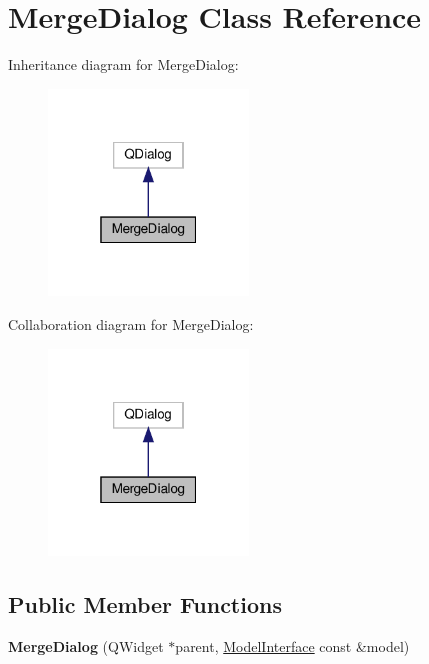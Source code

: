 \hypertarget{classMergeDialog}{}\section{Merge\+Dialog Class Reference}
\label{classMergeDialog}


Inheritance diagram for Merge\+Dialog\+:
\nopagebreak
\begin{figure}[H]
\begin{center}
\leavevmode
\includegraphics[width=151pt]{classMergeDialog__inherit__graph}
\end{center}
\end{figure}


Collaboration diagram for Merge\+Dialog\+:
\nopagebreak
\begin{figure}[H]
\begin{center}
\leavevmode
\includegraphics[width=151pt]{classMergeDialog__coll__graph}
\end{center}
\end{figure}
\subsection*{Public Member Functions}
\begin{DoxyCompactItemize}
\item 
\mbox{\label{classMergeDialog_ae95937aa77ed7551b9b7cc7b9a148180}} 
{\bfseries Merge\+Dialog} (Q\+Widget $\ast$parent, \hyperlink{classModelInterface}{Model\+Interface} const \&model)
\end{DoxyCompactItemize}


